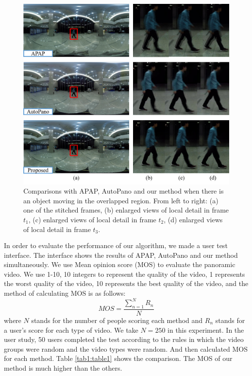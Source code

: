 \documentclass[conference]{IEEEtran}
\begin{document}
\begin{figure}[!htpb]
\centering
\includegraphics[scale=0.36]{picture36.png}
\caption{Comparisons with APAP, AutoPano and our method when there is an object moving in the overlapped region. From left to right: (a) one of the stitched frames, (b) enlarged views of local
detail in frame $t_1$, (c) enlarged views of local detail in frame $t_2$, (d) enlarged views of local detail in frame $t_3$.}
\label{fig:pic15}
\end{figure}

In order to evaluate the performance of our algorithm, we made a user test interface. The interface shows the results of APAP, AutoPano and our method simultaneously.
We use Mean opinion score (MOS) to evaluate the panoramic video. We use 1-10, 10 integers to represent the quality of the video, 
1 represents the worst quality of the video, 10 represents the best quality of the video, and the method of calculating MOS is as follows:
$$MOS=\frac{\sum^{N}_{n=1}{R_n}}{N}$$
where $N$ stands for the number of people scoring each method and $R_n$ stands for a user's score for each type of video. We take $N=250$ in this experiment.
In the user study, 50 users completed the test according to the rules in which the video groups were random and the video types were random.
And then calculated MOS for each method. Table \ref{tab1:table1} shows the comparison. The MOS of our method is much higher than the others.
\end{document}
